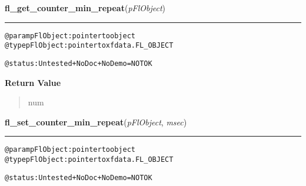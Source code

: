     \label{xformslib:flcounter:fl_get_counter_min_repeat}

    \vspace{0.5ex}

\hspace{.8\funcindent}\begin{boxedminipage}{\funcwidth}

    \raggedright \textbf{fl\_get\_counter\_min\_repeat}(\textit{pFlObject})

    \vspace{-1.5ex}

    \rule{\textwidth}{0.5\fboxrule}
\setlength{\parskip}{2ex}
\begin{alltt}
@param pFlObject: pointer to object
@type pFlObject: pointer to xfdata.FL\_OBJECT

        @status: Untested + NoDoc + NoDemo = NOT OK
    
\end{alltt}

\setlength{\parskip}{1ex}
      \textbf{Return Value}
    \vspace{-1ex}

      \begin{quote}
      num

      \end{quote}

    \end{boxedminipage}

    \label{xformslib:flcounter:fl_set_counter_min_repeat}

    \vspace{0.5ex}

\hspace{.8\funcindent}\begin{boxedminipage}{\funcwidth}

    \raggedright \textbf{fl\_set\_counter\_min\_repeat}(\textit{pFlObject}, \textit{msec})

    \vspace{-1.5ex}

    \rule{\textwidth}{0.5\fboxrule}
\setlength{\parskip}{2ex}
\begin{alltt}
        @param pFlObject: pointer to object
@type pFlObject: pointer to xfdata.FL\_OBJECT

        @status: Untested + NoDoc + NoDemo = NOT OK
    
\end{alltt}

\setlength{\parskip}{1ex}
    \end{boxedminipage}

